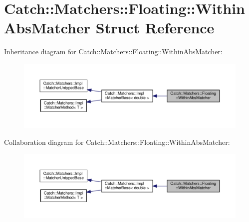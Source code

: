\hypertarget{structCatch_1_1Matchers_1_1Floating_1_1WithinAbsMatcher}{}\section{Catch\+:\+:Matchers\+:\+:Floating\+:\+:Within\+Abs\+Matcher Struct Reference}
\label{structCatch_1_1Matchers_1_1Floating_1_1WithinAbsMatcher}


Inheritance diagram for Catch\+:\+:Matchers\+:\+:Floating\+:\+:Within\+Abs\+Matcher\+:
\nopagebreak
\begin{figure}[H]
\begin{center}
\leavevmode
\includegraphics[width=350pt]{structCatch_1_1Matchers_1_1Floating_1_1WithinAbsMatcher__inherit__graph}
\end{center}
\end{figure}


Collaboration diagram for Catch\+:\+:Matchers\+:\+:Floating\+:\+:Within\+Abs\+Matcher\+:
\nopagebreak
\begin{figure}[H]
\begin{center}
\leavevmode
\includegraphics[width=350pt]{structCatch_1_1Matchers_1_1Floating_1_1WithinAbsMatcher__coll__graph}
\end{center}
\end{figure}
